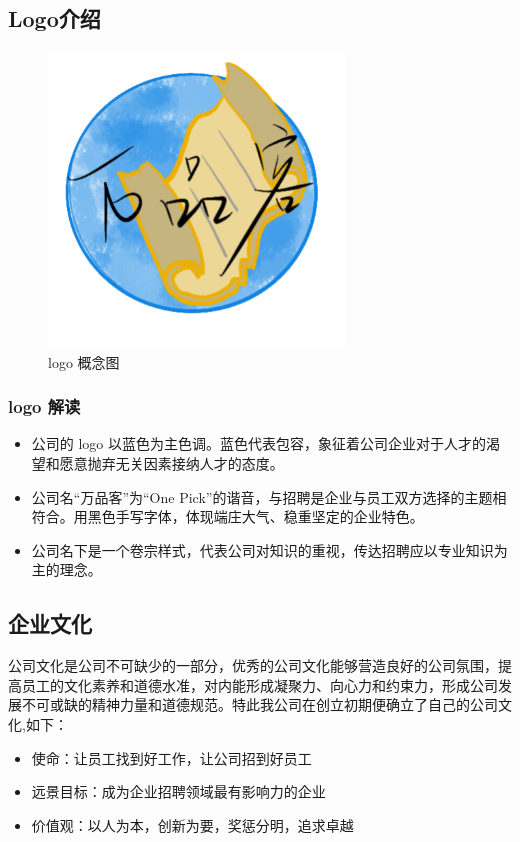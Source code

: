 \documentclass[master]{hduthesis}
\begin{document}
\subsection{Logo介绍}
\begin{figure}[H] %
	\centering %
	\includegraphics[width=0.7\textwidth]{pics/logo.png} %
	\caption{logo 概念图} %
	\label{Fig.main2} %
\end{figure}
\subsubsection{logo 解读}
\begin{itemize}
	\item{公司的 logo 以蓝色为主色调。蓝色代表包容，象征着公司企业对于人才的渴望和愿意抛弃无关因素接纳人才的态度。}
	\item{公司名“万品客”为“One Pick”的谐音，与招聘是企业与员工双方选择的主题相符合。用黑色手写字体，体现端庄大气、稳重坚定的企业特色。}
	\item{公司名下是一个卷宗样式，代表公司对知识的重视，传达招聘应以专业知识为主的理念。}
\end{itemize}
\subsection{企业文化}

公司文化是公司不可缺少的一部分，优秀的公司文化能够营造良好的公司氛围，提高员工的文化素养和道德水准，对内能形成凝聚力、向心力和约束力，形成公司发展不可或缺的精神力量和道德规范。特此我公司在创立初期便确立了自己的公司文化,如下：
\begin{itemize}
	\item 使命：让员工找到好工作，让公司招到好员工
	\item 远景目标：成为企业招聘领域最有影响力的企业
	\item 价值观：以人为本，创新为要，奖惩分明，追求卓越
\end{itemize}
\end{document}
